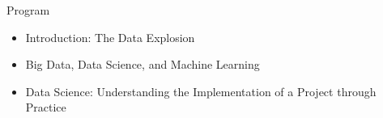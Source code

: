 \begin{frame}{Program}
  \begin{itemize}
    \item Introduction: The Data Explosion
    \item Big Data, Data Science, and Machine Learning
    \item Data Science: Understanding the Implementation of a Project through Practice
  \end{itemize}
\end{frame}
